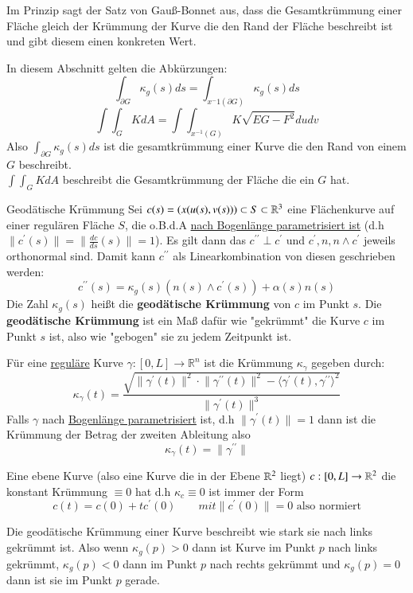 Im Prinzip sagt der Satz von Gauß-Bonnet aus, dass die Gesamtkrümmung einer Fläche gleich der Krümmung der Kurve die den Rand der Fläche beschreibt ist und gibt diesem einen konkreten Wert.

\begin{framed}
In diesem Abschnitt gelten die Abkürzungen:
$$\int_{\partial G}\kappa_g(s)ds=\int_{x^-{1}(\partial G)}\kappa_g(s)ds$$
$$\int\int_{G}KdA=\int\int_{x^{-1}(G)}K\sqrt{EG-F^2}dudv$$ 
Also $\int_{\partial G}\kappa_g(s)ds$ ist die gesamtkrümmung einer Kurve die den Rand von einem \aeGebiet $G$  beschreibt.\\
$\int\int_{G}KdA$ beschreibt die Gesamtkrümmung der Fläche die ein \aeGebiet $G$ hat.
\end{framed}

\begin{titleDef}{Geodätische Krümmung}
\label{geodaetischeKruemmung}
Sei $c(s)=(x(u(s),v(s)))\subset S\subset\mathbb{R}^3$ eine Flächenkurve auf einer regulären Fläche $S$, die o.B.d.A \hyperref[bogenlaenge]{nach Bogenlänge parametrisiert ist} (d.h $\lVert c^\prime(s)\rVert=\lVert \frac{dc}{ds}(s)\rVert=1$). Es gilt dann das $c^{\prime\prime}\perp c^\prime$ und $c^\prime,n,n\wedge c^\prime$ jeweils orthonormal sind. Damit kann $c^{\prime\prime}$ als Linearkombination von diesen geschrieben werden:
$$c^{\prime\prime}(s)=\kappa_g(s)(n(s)\wedge c^\prime(s))+\alpha(s)n(s)$$
Die Zahl $\kappa_g(s)$ heißt die \textbf{geodätische Krümmung} von $c$ im Punkt $s$.
Die \textbf{geodätische Krümmung} ist ein Maß dafür wie "gekrümmt" die Kurve $c$ im Punkt $s$ ist, also wie "gebogen" sie zu jedem Zeitpunkt ist.\par
Für eine \hyperref[regulaer]{reguläre} Kurve $\gamma:[0,L]\to\mathbb{R}^n$ ist die Krümmung $\kappa_\gamma$ gegeben durch:
$$\kappa_\gamma(t)=\frac{\sqrt{\lVert\gamma^\prime(t)\rVert^2\cdot \lVert\gamma^{\prime\prime}(t)\rVert^2-\langle\gamma^\prime(t),\gamma^{\prime\prime}\rangle^2}}{\lVert\gamma^\prime(t)\rVert^3}$$
Falls $\gamma$ nach \hyperref[bogenlaenge]{Bogenlänge parametrisiert} ist, d.h $\lVert\gamma^\prime(t)\rVert=1$ dann ist die Krümmung der Betrag der zweiten Ableitung also 
$$\kappa_\gamma(t)=\lVert\gamma^{\prime\prime}\rVert$$\par
Eine ebene Kurve (also eine Kurve die in der Ebene $\mathbb{R}^2$ liegt) $c:[0,L]\to\mathbb{R}^2$ die konstant Krümmung $\equiv0$ hat d.h $\kappa_c\equiv0$ ist immer der Form
$$c(t)=c(0)+tc^\prime(0)\qquad mit \lVert c^\prime(0)\rVert=0 \text{  also normiert}$$\par
Die geodätische Krümmung einer Kurve beschreibt wie stark sie nach links gekrümmt ist. Also wenn $\kappa_g(p)>0$ dann ist Kurve im Punkt $p$ nach links gekrümmt, $\kappa_g(p)<0$ dann im Punkt $p$ nach rechts gekrümmt und $\kappa_g(p)=0$ dann ist sie im Punkt $p$ gerade.
\end{titleDef}

